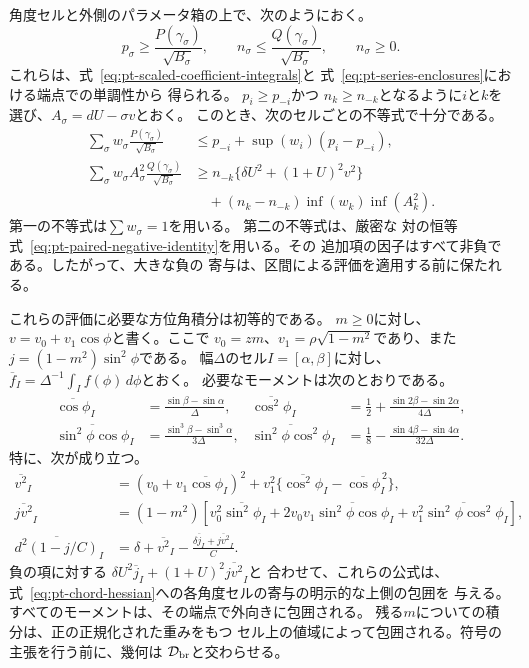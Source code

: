角度セルと外側のパラメータ箱の上で、次のようにおく。
\[
 p_\sigma\geq
 \frac{P(\gamma_\sigma)}{\sqrt{B_\sigma}},
 \qquad
 n_\sigma\leq
 \frac{Q(\gamma_\sigma)}{\sqrt{B_\sigma}},
 \qquad n_\sigma\geq0.
\]
これらは、式~\eqref{eq:pt-scaled-coefficient-integrals}と
式~\eqref{eq:pt-series-enclosures}における端点での単調性から
得られる。
$p_i\geq p_{-i}$かつ
$n_k\geq n_{-k}$となるように$i$と$k$を選び、$A_\sigma=dU-\sigma v$とおく。
このとき、次のセルごとの不等式で十分である。
\begin{align}
 \sum_\sigma w_\sigma
 \frac{P(\gamma_\sigma)}{\sqrt{B_\sigma}}
 &\leq p_{-i}+\sup(w_i)(p_i-p_{-i}),
 \label{eq:pt-positive-cell-bound}\\
 \sum_\sigma w_\sigma A_\sigma^2
 \frac{Q(\gamma_\sigma)}{\sqrt{B_\sigma}}
 &\geq n_{-k}\{\delta U^2+(1+U)^2v^2\}
 \nonumber\\
 &\quad +(n_k-n_{-k})\inf(w_k)\inf(A_k^2).
 \label{eq:pt-negative-cell-bound}
\end{align}
第一の不等式は$\sum w_\sigma=1$を用いる。
第二の不等式は、厳密な
対の恒等式~\eqref{eq:pt-paired-negative-identity}を用いる。その
追加項の因子はすべて非負である。したがって、大きな負の
寄与は、区間による評価を適用する前に保たれる。

これらの評価に必要な方位角積分は初等的である。
$m\geq0$に対し、
$v=v_0+v_1\cos\phi$と書く。ここで
$v_0=zm$、$v_1=\rho\sqrt{1-m^2}$であり、また
$j=(1-m^2)\sin^2\phi$である。
幅$\Delta$のセル$I=[\alpha,\beta]$に対し、
$\overline f_I=\Delta^{-1}\int_I f(\phi)\,d\phi$とおく。
必要なモーメントは次のとおりである。
\begin{align}
 \overline{\cos\phi}_I
 &=\frac{\sin\beta-\sin\alpha}{\Delta},&
 \overline{\cos^2\phi}_I
 &=\frac12+\frac{\sin2\beta-\sin2\alpha}{4\Delta},
 \label{eq:pt-azimuth-moments-one}\\
 \overline{\sin^2\phi\cos\phi}_I
 &=\frac{\sin^3\beta-\sin^3\alpha}{3\Delta},&
 \overline{\sin^2\phi\cos^2\phi}_I
 &=\frac18-\frac{\sin4\beta-\sin4\alpha}{32\Delta}.
 \label{eq:pt-azimuth-moments-two}
\end{align}
特に、次が成り立つ。
\begin{align}
 \overline{v^2}_I
 &=(v_0+v_1\overline{\cos\phi}_I)^2
 +v_1^2\{\overline{\cos^2\phi}_I-
             \overline{\cos\phi}_I^{\,2}\},\nonumber\\
 \overline{jv^2}_I
 &=(1-m^2)\left[
 v_0^2\overline{\sin^2\phi}_I
 +2v_0v_1\overline{\sin^2\phi\cos\phi}_I
 +v_1^2\overline{\sin^2\phi\cos^2\phi}_I\right],\nonumber\\
 \overline{d^2(1-j/C)}_I
 &=\delta+\overline{v^2}_I
 -\frac{\delta\overline j_I+\overline{jv^2}_I}{C}.
 \label{eq:pt-azimuth-moment-combinations}
\end{align}
負の項に対する
$\delta U^2\overline j_I+(1+U)^2\overline{jv^2}_I$と
合わせて、これらの公式は、
式~\eqref{eq:pt-chord-hessian}への各角度セルの寄与の明示的な上側の包囲を
与える。
すべてのモーメントは、その端点で外向きに包囲される。
残る$m$についての積分は、正の正規化された重みをもつ
セル上の値域によって包囲される。符号の主張を行う前に、幾何は
$\mathcal D_{\rm br}$と交わらせる。

